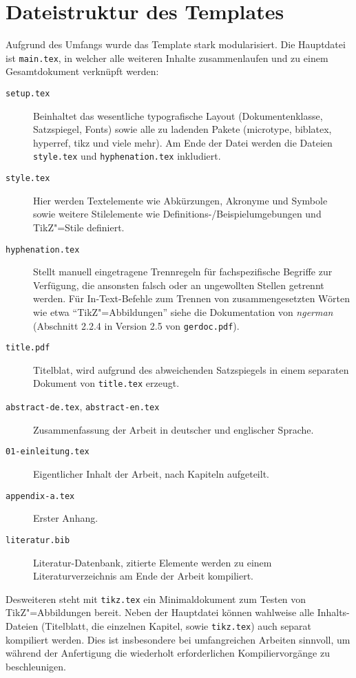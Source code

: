 \section{Dateistruktur des Templates}\label{sec:struktur}
%
Aufgrund des Umfangs wurde das Template stark modularisiert. Die Hauptdatei ist \texttt{main.tex}, in welcher alle weiteren Inhalte zusammenlaufen und zu einem Gesamtdokument verknüpft werden:
%
\begin{description}
  \item[\texttt{setup.tex}] Beinhaltet das wesentliche typografische Layout (Dokumentenklasse, Satzspiegel, Fonts) sowie alle zu ladenden Pakete (microtype, biblatex, hyperref, tikz und viele mehr). Am Ende der Datei werden die Dateien \texttt{style.tex} und \texttt{hyphenation.tex} inkludiert.
  \item[\texttt{style.tex}] Hier werden Textelemente wie Abkürzungen, Akronyme und Symbole sowie weitere Stilelemente wie Definitions-/Beispielumgebungen und TikZ"=Stile definiert.
  \item[\texttt{hyphenation.tex}] Stellt manuell eingetragene Trennregeln für fachspezifische Begriffe zur Verfügung, die ansonsten falsch oder an ungewollten Stellen getrennt werden. Für In-Text-Befehle zum Trennen von zusammengesetzten Wörten wie etwa \enquote{TikZ"=Abbildungen} siehe die Dokumentation von \emph{ngerman} (Abschnitt 2.2.4 in Version 2.5 von \texttt{gerdoc.pdf}).
  \item[\texttt{title.pdf}] Titelblat, wird aufgrund des abweichenden Satzspiegels in einem separaten Dokument von \texttt{title.tex} erzeugt.
  \item[\texttt{abstract-de.tex}, \texttt{abstract-en.tex}] Zusammenfassung der Arbeit in deutscher und englischer Sprache.
  \item[\texttt{01-einleitung.tex} \usw{}] Eigentlicher Inhalt der Arbeit, nach Kapiteln aufgeteilt.
  \item[\texttt{appendix-a.tex}] Erster Anhang.
  \item[\texttt{literatur.bib}] Literatur-Datenbank, zitierte Elemente werden zu einem Literaturverzeichnis am Ende der Arbeit kompiliert.
\end{description}
%
Desweiteren steht mit \texttt{tikz.tex} ein Minimaldokument zum Testen von TikZ"=Abbildungen bereit. Neben der Hauptdatei können wahlweise alle Inhalts-Dateien (Titelblatt, die einzelnen Kapitel, sowie \texttt{tikz.tex}) auch separat kompiliert werden. Dies ist insbesondere bei umfangreichen Arbeiten sinnvoll, um während der Anfertigung die wiederholt erforderlichen Kompiliervorgänge zu beschleunigen.
%
%

